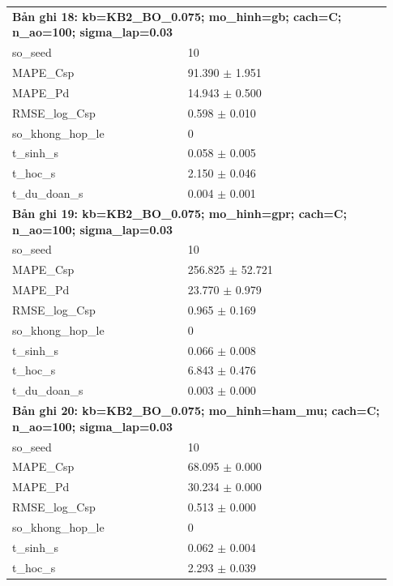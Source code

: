 \begin{longtable}{p{0.43\linewidth}p{0.50\linewidth}}
\midrule
\multicolumn{2}{p{0.95\linewidth}}{\textbf{Bản ghi 18: kb=KB2\_BO\_0.075; mo\_hinh=gb; cach=C; n\_ao=100; sigma\_lap=0.03}} \\
so\_\allowbreak seed & 10 \\
MAPE\_\allowbreak Csp & 91.390 $\pm$ 1.951 \\
MAPE\_\allowbreak Pd & 14.943 $\pm$ 0.500 \\
RMSE\_\allowbreak log\_\allowbreak Csp & 0.598 $\pm$ 0.010 \\
so\_\allowbreak khong\_\allowbreak hop\_\allowbreak le & 0 \\
t\_\allowbreak sinh\_\allowbreak s & 0.058 $\pm$ 0.005 \\
t\_\allowbreak hoc\_\allowbreak s & 2.150 $\pm$ 0.046 \\
t\_\allowbreak du\_\allowbreak doan\_\allowbreak s & 0.004 $\pm$ 0.001 \\
\midrule
\multicolumn{2}{p{0.95\linewidth}}{\textbf{Bản ghi 19: kb=KB2\_BO\_0.075; mo\_hinh=gpr; cach=C; n\_ao=100; sigma\_lap=0.03}} \\
so\_\allowbreak seed & 10 \\
MAPE\_\allowbreak Csp & 256.825 $\pm$ 52.721 \\
MAPE\_\allowbreak Pd & 23.770 $\pm$ 0.979 \\
RMSE\_\allowbreak log\_\allowbreak Csp & 0.965 $\pm$ 0.169 \\
so\_\allowbreak khong\_\allowbreak hop\_\allowbreak le & 0 \\
t\_\allowbreak sinh\_\allowbreak s & 0.066 $\pm$ 0.008 \\
t\_\allowbreak hoc\_\allowbreak s & 6.843 $\pm$ 0.476 \\
t\_\allowbreak du\_\allowbreak doan\_\allowbreak s & 0.003 $\pm$ 0.000 \\
\midrule
\multicolumn{2}{p{0.95\linewidth}}{\textbf{Bản ghi 20: kb=KB2\_BO\_0.075; mo\_hinh=ham\_mu; cach=C; n\_ao=100; sigma\_lap=0.03}} \\
so\_\allowbreak seed & 10 \\
MAPE\_\allowbreak Csp & 68.095 $\pm$ 0.000 \\
MAPE\_\allowbreak Pd & 30.234 $\pm$ 0.000 \\
RMSE\_\allowbreak log\_\allowbreak Csp & 0.513 $\pm$ 0.000 \\
so\_\allowbreak khong\_\allowbreak hop\_\allowbreak le & 0 \\
t\_\allowbreak sinh\_\allowbreak s & 0.062 $\pm$ 0.004 \\
t\_\allowbreak hoc\_\allowbreak s & 2.293 $\pm$ 0.039 \\

\end{longtable}
